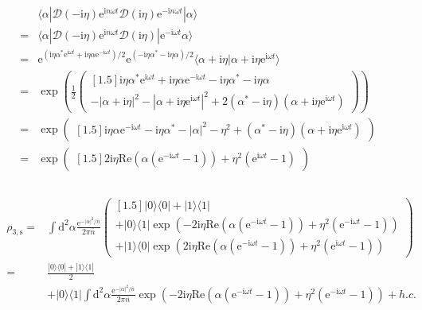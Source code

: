 \documentclass[10pt,fleqn]{article}
\newcommand{\ud}{\mathrm{d}}
\newcommand{\ue}{\mathrm{e}}
\newcommand{\ui}{\mathrm{i}}
\newcommand{\eqar}[1]
{
  \begin{align}
    #1
  \end{align}
}
\newcommand{\paren}[1]{{\left({#1}\right)}}
\newcommand{\abs}[1]{{\left|{#1}\right|}}
\begin{document}
\eqar{
  \begin{split}
    &\langle\alpha|\mathcal{D}(-\ui\eta)\ue^{\ui n\omega t}
      \mathcal{D}(\ui\eta)\ue^{-\ui n\omega t}|\alpha\rangle\\
    =&\langle\alpha|\mathcal{D}(-\ui\eta)\ue^{\ui n\omega t}
       \mathcal{D}(\ui\eta)|\ue^{-\ui\omega t}\alpha\rangle\\
    =&\ue^{(\ui\eta\alpha^*\ue^{\ui\omega t}+\ui\eta\alpha\ue^{-\ui\omega t})/2}
       \ue^{(-\ui\eta\alpha^*-\ui\eta\alpha)/2}
       \langle\alpha+\ui\eta|\alpha+\ui\eta\ue^{\ui\omega t}\rangle\\
    =&\exp\paren{\frac12
       \begin{pmatrix}[1.5]
         \ui\eta\alpha^*\ue^{\ui\omega t}+\ui\eta\alpha\ue^{-\ui\omega t}
         -\ui\eta\alpha^*-\ui\eta\alpha\\
         -\abs{\alpha+\ui\eta}^2-\abs{\alpha+\ui\eta\ue^{\ui\omega t}}^2
         +2\paren{\alpha^*-\ui\eta}\paren{\alpha+\ui\eta\ue^{\ui\omega t}}
       \end{pmatrix}
       }\\
    =&\exp\begin{pmatrix}[1.5]
      \ui\eta\alpha\ue^{-\ui\omega t}-\ui\eta\alpha^*-\abs{\alpha}^2-\eta^2+\paren{\alpha^*-\ui\eta}\paren{\alpha+\ui\eta\ue^{\ui\omega t}}
    \end{pmatrix}\\
    =&\exp\begin{pmatrix}[1.5]
      2\ui\eta\mathrm{Re}\paren{\alpha\paren{\ue^{-\ui\omega t}-1}}
      +\eta^2\paren{\ue^{\ui\omega t}-1}
    \end{pmatrix}\\
  \end{split}
}
\eqar{
  \begin{split}
    \rho_{3,\mathrm{s}}
    =&\int\ud^2\alpha \frac{\ue^{-\abs{\alpha}^2/{\bar n}}}{2\pi {\bar n}}
       \begin{pmatrix}[1.5]
         |0\rangle\langle0|
         +|1\rangle\langle1|\\
         +|0\rangle\langle1|
         \exp\paren{
         -2\ui\eta\mathrm{Re}\paren{\alpha\paren{\ue^{-\ui\omega t}-1}}
         +\eta^2\paren{\ue^{-\ui\omega t}-1}}\\
         +|1\rangle\langle0|
         \exp\paren{
         2\ui\eta\mathrm{Re}\paren{\alpha\paren{\ue^{-\ui\omega t}-1}}
         +\eta^2\paren{\ue^{\ui\omega t}-1}}
       \end{pmatrix}\\
    =&\frac{|0\rangle\langle0|+|1\rangle\langle1|}{2}\\
    &+|0\rangle\langle1|\int\ud^2\alpha \frac{\ue^{-\abs{\alpha}^2/{\bar n}}}{2\pi {\bar n}}
      \exp\paren{
      -2\ui\eta\mathrm{Re}\paren{\alpha\paren{\ue^{-\ui\omega t}-1}}
      +\eta^2\paren{\ue^{-\ui\omega t}-1}}+h.c.
  \end{split}
}
\end{document}

